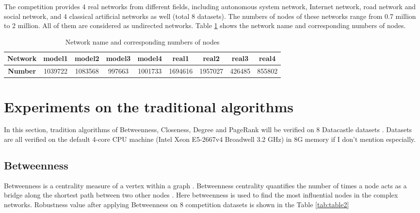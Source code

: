 \documentclass{article}
\begin{document}
	
	The competition provides 4 real networks from different fields, including autonomous system network, Internet network, road network and social network, and 4 classical artificial networks as well (total 8 datasets). The numbers of nodes of these networks range from 0.7 million to 2 million. All of them are considered as undirected networks. Table \ref{tab:table1} shows the network name and corresponding numbers of nodes.
	

	\begin{table}[!htbp]
	
	\centering
	\caption{ Network name and corresponding numbers of nodes}
	\label{tab:table1}
		\begin{tabular}{|c|c|c|c|c|c|c|c|c|}
			\hline
			\textbf{Network} & \textbf{model1} & \textbf{model2} & \textbf{model3} & \textbf{model4} & \textbf{real1} & \textbf{real2} & \textbf{real3} & \textbf{real4} \\ \hline
			\textbf{Number} & 1039722         & 1083568         & 997663          & 1001733         & 1694616        & 1957027        & 426485         & 855802         \\ \hline
		\end{tabular}
	\end{table}


	\section{Experiments on the traditional algorithms}
	
	In this section, tradition algorithms of Betweenness\cite{wikiBetweennesscentrality}, Closeness\cite{wikiClosenesscentrality}, Degree\cite{wikiCentrality} and PageRank\cite{wikiPageRank}  will be verified on 8 Datacastle datasets . Datasets are all verified on the default 4-core CPU machine (Intel Xeon E5-2667v4 Broadwell 3.2 GHz) in 8G memory if I don't mention especially.


	\subsection{Betweenness}
	
	Betweenness is a centrality measure of a vertex within a graph . Betweenness centrality quantifies the number of times a node acts as a bridge along the shortest path between two other nodes \cite{wikiBetweennesscentrality}\cite{freeman1977set}. Here betweenness is used to find the most influential nodes in the complex networks. Robustness value after applying Betweenness on 8 competition datasets is shown in the Table \ref{tab:table2}
	
\end{document}
